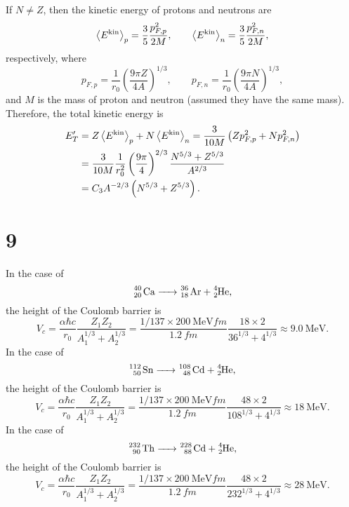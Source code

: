 \documentclass[a4paper,11pt]{jsarticle}
\begin{document}
If $N\neq Z$, then the kinetic energy of protons and neutrons are 
\begin{equation}
  \ev{E^{\mathrm{kin}}}_p = \frac{3}{5}\frac{p_{F,p}^2}{2M}, \qquad \ev{E^{\mathrm{kin}}}_n = \frac{3}{5}\frac{p_{F,n}^2}{2M},
\end{equation}
respectively, where
\begin{equation}
  p_{F,p} = \frac{1}{r_0}\left(\frac{9\pi Z}{4A}\right)^{1/3}, \qquad p_{F,n} = \frac{1}{r_0}\left(\frac{9\pi N}{4A}\right)^{1/3},
\end{equation}
and $M$ is the mass of proton and neutron (assumed they have the same mass).
Therefore, the total kinetic energy is 
\begin{align}
  E_T' &= Z\ev{E^{\mathrm{kin}}}_p + N\ev{E^{\mathrm{kin}}}_n 
  = \frac{3}{10M}\left(Zp_{F,p}^2 + Np_{F,n}^2\right) \notag\\
  &= \frac{3}{10M}\frac{1}{r_0^2} \left(\frac{9\pi}{4}\right)^{2/3} \frac{N^{5/3}+Z^{5/3}}{A^{2/3}} \notag\\
  &= C_3 A^{-2/3}\left(N^{5/3}+Z^{5/3}\right).
\end{align}

\section*{9}

In the case of
\begin{equation}
  \ce{^40_20 Ca -> ^36_18 Ar + ^4_2He},
\end{equation}
the height of the Coulomb barrier is
\begin{equation}
  V_c = \frac{\alpha\hbar c}{r_0}\frac{Z_1Z_2}{A_1^{1/3}+A_2^{1/3}} = \frac{1/137\times \SI{200}{\MeV fm}}{\SI{1.2}{fm}}\frac{18\times 2}{36^{1/3}+4^{1/3}} \approx \SI{9.0}{\MeV}.
\end{equation}
In the case of
\begin{equation}
  \ce{^112_50 Sn -> ^108_48 Cd + ^4_2He},
\end{equation}
the height of the Coulomb barrier is
\begin{equation}
  V_c = \frac{\alpha\hbar c}{r_0}\frac{Z_1Z_2}{A_1^{1/3}+A_2^{1/3}} = \frac{1/137\times \SI{200}{\MeV fm}}{\SI{1.2}{fm}}\frac{48\times 2}{108^{1/3}+4^{1/3}} \approx \SI{18}{\MeV}.
\end{equation}
In the case of
\begin{equation}
  \ce{^232_90 Th -> ^228_88 Cd + ^4_2He},
\end{equation}
the height of the Coulomb barrier is
\begin{equation}
  V_c = \frac{\alpha\hbar c}{r_0}\frac{Z_1Z_2}{A_1^{1/3}+A_2^{1/3}} = \frac{1/137\times \SI{200}{\MeV fm}}{\SI{1.2}{fm}}\frac{48\times 2}{232^{1/3}+4^{1/3}} \approx \SI{28}{\MeV}.
\end{equation}
\end{document}
